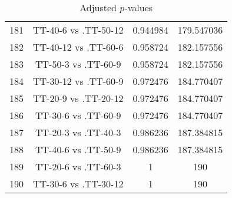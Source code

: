 \documentclass[a4paper,10pt]{article}
\begin{document}
\begin{landscape}
\begin{table}[!htp]
\begin{tabular}{cccc}
181&TT-40-6 vs .TT-50-12&0.944984&179.547036\\
182&TT-40-12 vs .TT-60-6&0.958724&182.157556\\
183&TT-50-3 vs .TT-60-9&0.958724&182.157556\\
184&TT-30-12 vs .TT-60-9&0.972476&184.770407\\
185&TT-20-9 vs .TT-20-12&0.972476&184.770407\\
186&TT-30-6 vs .TT-60-9&0.972476&184.770407\\
187&TT-20-3 vs .TT-40-3&0.986236&187.384815\\
188&TT-40-6 vs .TT-50-9&0.986236&187.384815\\
189&TT-20-6 vs .TT-60-3&1&190\\
190&TT-30-6 vs .TT-30-12&1&190\\
\hline
\end{tabular}
\caption{Adjusted $p$-values}
\end{table}

\end{landscape}
\end{document}
